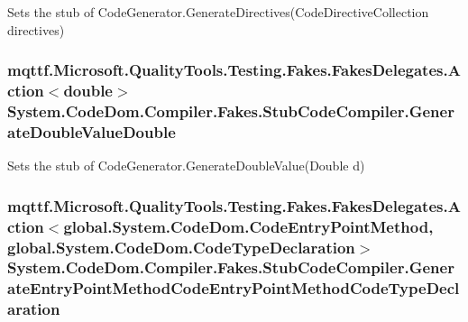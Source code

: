 Sets the stub of Code\-Generator.\-Generate\-Directives(\-Code\-Directive\-Collection directives)

\hypertarget{class_system_1_1_code_dom_1_1_compiler_1_1_fakes_1_1_stub_code_compiler_a901ea0d62733c39b62e1e4a29f34d952}{
\subsubsection[{Generate\-Double\-Value\-Double}]{\setlength{\rightskip}{0pt plus 5cm}mqttf.\-Microsoft.\-Quality\-Tools.\-Testing.\-Fakes.\-Fakes\-Delegates.\-Action$<$double$>$ System.\-Code\-Dom.\-Compiler.\-Fakes.\-Stub\-Code\-Compiler.\-Generate\-Double\-Value\-Double}}\label{class_system_1_1_code_dom_1_1_compiler_1_1_fakes_1_1_stub_code_compiler_a901ea0d62733c39b62e1e4a29f34d952}


Sets the stub of Code\-Generator.\-Generate\-Double\-Value(\-Double d)

\hypertarget{class_system_1_1_code_dom_1_1_compiler_1_1_fakes_1_1_stub_code_compiler_abb80e565ce39c7e54d74dcc5a698c123}{
\subsubsection[{Generate\-Entry\-Point\-Method\-Code\-Entry\-Point\-Method\-Code\-Type\-Declaration}]{\setlength{\rightskip}{0pt plus 5cm}mqttf.\-Microsoft.\-Quality\-Tools.\-Testing.\-Fakes.\-Fakes\-Delegates.\-Action$<$global.\-System.\-Code\-Dom.\-Code\-Entry\-Point\-Method, global.\-System.\-Code\-Dom.\-Code\-Type\-Declaration$>$ System.\-Code\-Dom.\-Compiler.\-Fakes.\-Stub\-Code\-Compiler.\-Generate\-Entry\-Point\-Method\-Code\-Entry\-Point\-Method\-Code\-Type\-Declaration}}\label{class_system_1_1_code_dom_1_1_compiler_1_1_fakes_1_1_stub_code_compiler_abb80e565ce39c7e54d74dcc5a698c123}


